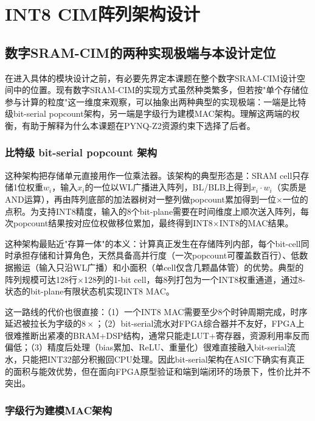 \documentclass[bachelor,compact,nofont]{xjtuthesis}
\numberwithin{equation}{chapter}
\begin{document}
\chapter{INT8 CIM阵列架构设计}

\section{数字SRAM-CIM的两种实现极端与本设计定位}
\label{sec:two_extremes}

在进入具体的模块设计之前，有必要先界定本课题在整个数字SRAM-CIM设计空间中的位置。现有数字SRAM-CIM的实现方式虽然种类繁多，但若按"单个存储位参与计算的粒度"这一维度来观察，可以抽象出两种典型的实现极端：一端是比特级bit-serial popcount架构，另一端是字级行为建模MAC架构。理解这两端的权衡，有助于解释为什么本课题在PYNQ-Z2资源约束下选择了后者。

\subsection{比特级 bit-serial popcount 架构}

这种架构把存储单元直接用作一位乘法器。该架构的典型形态是：SRAM cell只存储1位权重$w_i$，输入$x_i$的一位以WL广播进入阵列，BL/BLB上得到$x_i \cdot w_i$（实质是AND运算），再由阵列底部的加法器树对一整列做popcount累加得到一位×一位的点积。为支持INT8精度，输入的8个bit-plane需要在时间维度上顺次送入阵列，每次popcount结果按对应位权做移位累加，最终得到INT8$\times$INT8的MAC结果。

这种架构最贴近"存算一体"的本义：计算真正发生在存储阵列内部，每个bit-cell同时承担存储和计算角色，天然具备高并行度（一次popcount可覆盖数百行）、低数据搬运（输入只沿WL广播）和小面积（单cell仅含几颗晶体管）的优势。典型的阵列规模可达128行$\times$128列的1-bit cell，每8列打包为一个INT8权重通道，通过8-状态的bit-plane有限状态机实现INT8 MAC。

这一路线的代价也很直接：（1）一个INT8 MAC需要至少8个时钟周期完成，时序延迟被拉长为字级的$8\times$；（2）bit-serial流水对FPGA综合器并不友好，FPGA上很难推断出紧凑的BRAM+DSP结构，通常只能走LUT+寄存器，资源利用率反而偏低；（3）精度后处理（bias累加、ReLU、重量化）很难直接融入bit-serial流水，只能把INT32部分积搬回CPU处理。因此bit-serial架构在ASIC下确实有真正的面积与能效优势，但在面向FPGA原型验证和端到端闭环的场景下，性价比并不突出。

\subsection{字级行为建模MAC架构}
\end{document}
